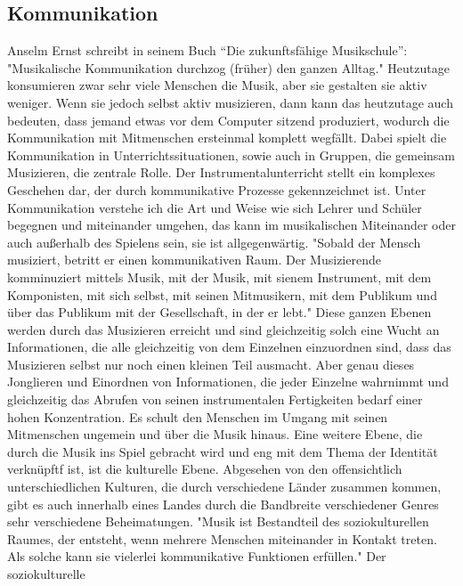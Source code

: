\subsection{Kommunikation}
Anselm Ernst schreibt in seinem Buch \enquote{Die zukunftsfähige Musikschule}: "Musikalische Kommunikation durchzog (früher) den ganzen Alltag."
\autocite[37]{ernst:die_zukunftsfaehige_musikschule} Heutzutage konsumieren zwar
sehr viele Menschen die Musik, aber sie gestalten sie aktiv weniger. Wenn sie
jedoch selbst aktiv musizieren, dann kann das heutzutage auch bedeuten, dass
jemand etwas vor dem Computer sitzend produziert, wodurch die Kommunikation mit
Mitmenschen ersteinmal komplett wegfällt.
Dabei spielt die Kommunikation in Unterrichtssituationen, sowie auch in Gruppen, die
gemeinsam Musizieren, die zentrale Rolle. Der Instrumentalunterricht stellt ein komplexes Geschehen dar, der
durch
kommunikative Prozesse gekennzeichnet ist.
Unter Kommunikation verstehe ich die Art und Weise wie sich Lehrer und Schüler
begegnen und miteinander umgehen, das kann im musikalischen Miteinander oder
auch außerhalb des Spielens sein, sie ist allgegenwärtig. 
"Sobald der Mensch musiziert, betritt er einen kommunikativen Raum. Der
Musizierende komminuziert mittels Musik, mit der Musik, mit sienem Instrument,
mit dem Komponisten, mit sich selbst, mit seinen Mitmusikern, mit dem Publikum
und über das Publikum mit der Gesellschaft, in der er lebt." \autocite[56]{doerne:umfassend_musizieren}
Diese ganzen Ebenen werden durch das Musizieren erreicht und sind gleichzeitig
solch eine Wucht an Informationen, die alle gleichzeitig von dem Einzelnen
einzuordnen sind, dass das Musizieren selbst nur noch einen kleinen Teil
ausmacht. Aber genau dieses Jonglieren und Einordnen von Informationen, die
jeder Einzelne wahrnimmt und gleichzeitig das Abrufen von seinen instrumentalen
Fertigkeiten bedarf einer hohen Konzentration. Es schult den Menschen im Umgang
mit seinen Mitmenschen ungemein und über die Musik hinaus. Eine weitere Ebene,
die durch die Musik ins Spiel gebracht wird und eng mit dem Thema der
Identität verknüpftf ist, ist die kulturelle Ebene. Abgesehen von den
offensichtlich unterschiedlichen Kulturen, die durch verschiedene Länder
zusammen kommen, gibt es auch innerhalb eines Landes durch die Bandbreite
verschiedener Genres sehr verschiedene Beheimatungen. 
"Musik ist Bestandteil des soziokulturellen Raumes, der entsteht, wenn mehrere
Menschen miteinander in Kontakt treten. Als solche kann sie vielerlei
kommunikative Funktionen erfüllen." \autocite[56]{doerne:umfassend_musizieren} Der soziokulturelle
